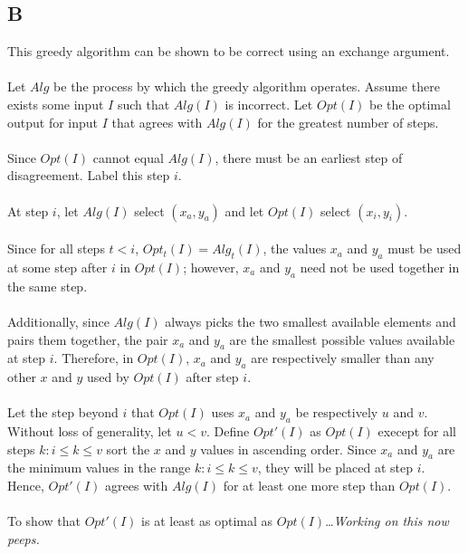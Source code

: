 \documentclass{article}
\begin{document}
\subsection*{B}
This greedy algorithm can be shown to be correct using an
exchange argument.\\\\
Let $Alg$ be the process by which the greedy algorithm operates.
Assume there exists some input $I$ such that $Alg(I)$ is incorrect.
Let $Opt(I)$ be the optimal output for input $I$ that agrees with
$Alg(I)$ for the greatest number of steps.\\\\
Since $Opt(I)$ cannot equal $Alg(I)$, there must be an earliest
step of disagreement.  Label this step $i$.\\\\
At step $i$, let $Alg(I)$ select $(x_a, y_a)$ and let $Opt(I)$ select
$(x_i,y_i)$.\\\\
Since for all steps $t < i$, $Opt_t(I) = Alg_t(I)$, the values $x_a$ and
$y_a$ must be used at some step after $i$ in $Opt(I)$; however, $x_a$ and
$y_a$ need not be used together in the same step.\\\\
Additionally, since $Alg(I)$ always picks the two smallest available
elements and pairs them together, the pair $x_a$ and $y_a$ are the smallest
possible values available at step $i$.  Therefore, in $Opt(I)$, $x_a$ and
$y_a$ are respectively smaller than any other $x$ and $y$ used by $Opt(I)$
after step $i$.\\\\
Let the step beyond $i$ that $Opt(I)$ uses
$x_a$ and $y_a$ be respectively $u$ and $v$.  Without loss of generality,
let $u < v$.  Define $Opt'(I)$ as $Opt(I)$ execept for all steps $k: i \leq 
k \leq v$ sort the $x$ and $y$ values in ascending order.  Since $x_a$ and $y_a$
are the minimum values in the range $k: i \leq k \leq v$, they will be placed
at step $i$.  Hence, $Opt'(I)$ agrees with $Alg(I)$ for at least one more
step than $Opt(I)$.\\\\
To show that $Opt'(I)$ is at least as optimal as $Opt(I)$\dots \textit{Working on this 
now peeps.}    
\end{document}
